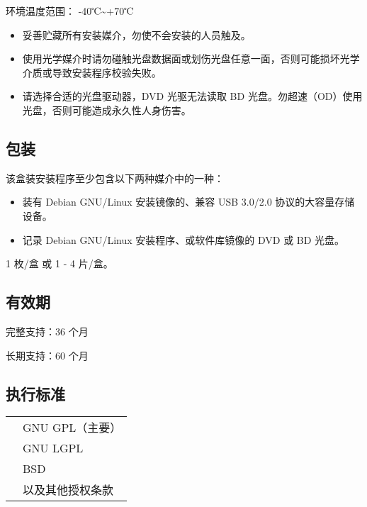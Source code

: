 \documentclass{article}
\begin{document}
\begin{multicols*}{3}
	环境温度范围： -40℃\textasciitilde +70℃


	\begin{itemize}[leftmargin=*]
		\setlength{\itemsep}{0pt}
		\setlength{\parskip}{0pt}
		\setlength{\parsep}{0pt}
		\item 妥善贮藏所有安装媒介，勿使不会安装的人员触及。
		\item 使用光学媒介时请勿碰触光盘数据面或划伤光盘任意一面，否则可能损坏光学介质或导致安装程序校验失败。
		\item 请选择合适的光盘驱动器，DVD 光驱无法读取 BD 光盘。勿超速（OD）使用光盘，否则可能造成永久性人身伤害。
		\end{itemize}
	\medskip

	\begin{tcolorbox}
	\section*{包装}
	\end{tcolorbox}

	该盒装安装程序至少包含以下两种媒介中的一种：
	\begin{itemize}[leftmargin=*]
		\setlength{\itemsep}{0pt}
		\setlength{\parskip}{0pt}
		\setlength{\parsep}{0pt}
		\item 装有 Debian GNU/Linux 安装镜像的、兼容 USB 3.0/2.0 协议的大容量存储设备。
		\item 记录 Debian GNU/Linux 安装程序、或软件库镜像的 DVD 或 BD 光盘。
	\end{itemize}

	1 枚/盒 或 1 - 4 片/盒。

	\medskip


	\begin{tcolorbox}
	\section*{有效期}
	\end{tcolorbox}

	完整支持：36 个月

	长期支持：60 个月

	\medskip


	\begin{tcolorbox}
	\section*{执行标准}
	\end{tcolorbox}
	\begin{tabularx}{\linewidth}{@{}ll@{}}
		\multirow{4}{*}{}{开源许可证：} & GNU GPL（主要）\\
		~ & GNU LGPL \\
		~ & BSD \\
		~ & 以及其他授权条款 \\
	\end{tabularx}


\end{multicols*}
\end{document}
